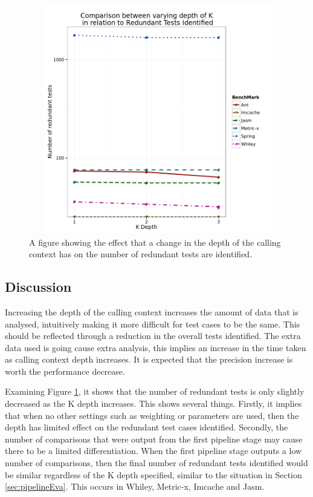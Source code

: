 \begin{figure}[h]
\begin{center}
\includegraphics[height=10cm, width = 14.5cm]{KDepth.png}
\end{center}
\caption{A figure showing the effect that a change in the depth of the calling context has on the number of redundant tests are identified.}
\label{fig:kdepthgraph}
\end{figure}

\subsection{Discussion}
Increasing the depth of the calling context increases the amount of data that is analysed, intuitively making it more difficult for test cases to be the same. This should be reflected through a reduction in the overall tests identified. The extra data used is going cause extra analysis, this implies an increase in the time taken as calling context depth increases. It is expected that the precision increase is worth the performance decrease.

Examining Figure \ref{fig:kdepthgraph}, it shows that the number of redundant tests is only slightly decreased as the K depth increases. This shows several things. Firstly, it implies that when no other settings such as weighting or parameters are used, then the depth has limited effect on the redundant test cases identified. Secondly, the number of comparisons that were output from the first pipeline stage may cause there to be a limited differentiation. When the first pipeline stage outputs a low number of comparisons, then the final number of redundant tests identified would be similar regardless of the K depth specified, similar to the situation in Section \ref{sec:pipelineEva}. This occurs in Whiley, Metric-x, Imcache and Jasm. 


